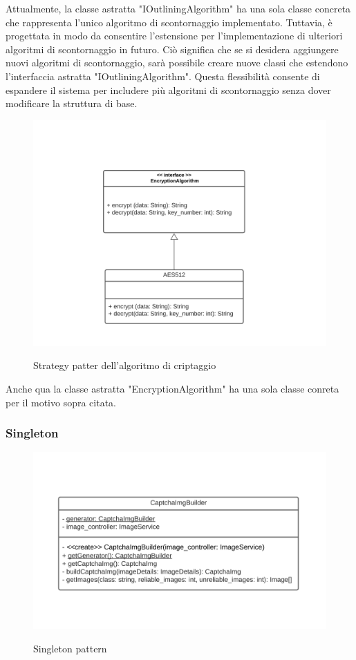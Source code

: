 Attualmente, la classe astratta "IOutliningAlgorithm" ha una sola classe concreta che rappresenta l'unico algoritmo 
di scontornaggio implementato. Tuttavia, è progettata in modo da consentire l'estensione per l'implementazione di ulteriori 
algoritmi di scontornaggio in futuro. Ciò significa che se si desidera aggiungere nuovi algoritmi di scontornaggio, 
sarà possibile creare nuove classi che estendono l'interfaccia astratta "IOutliningAlgorithm". 
Questa flessibilità consente di espandere il sistema per includere più algoritmi di scontornaggio senza dover 
modificare la struttura di base.

\begin{figure}[H]
    \centering
    \includegraphics[scale = 1.0]{img/criptStrategy.png}\\
    \caption{Strategy patter dell'algoritmo di criptaggio}
\end{figure}

Anche qua la classe astratta "EncryptionAlgorithm" ha una sola classe conreta per il motivo sopra citata.

\subsubsection{Singleton}

\begin{figure}[H]
    \centering
    \includegraphics[scale = 1.0]{img/singleton.png}\\
    \caption{Singleton pattern}
\end{figure}